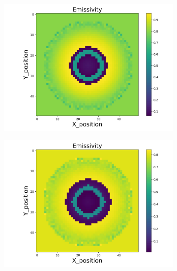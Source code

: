\begin{figure}[p]
\begin{minipage}{\textwidth}
        \begin{subfigure}{0.325\textwidth}
            \centering
            \includegraphics[width=\textwidth]{figures/raw_data/23/quad/emi_cal.jpg}
        \end{subfigure}
        \begin{subfigure}{0.325\textwidth}
            \centering
            \includegraphics[width=\textwidth]{figures/raw_data/24/quad/emi_cal.jpg}
        \end{subfigure}
    \end{minipage}\\
    \begin{minipage}{\textwidth}

\end{minipage}
\end{figure}
